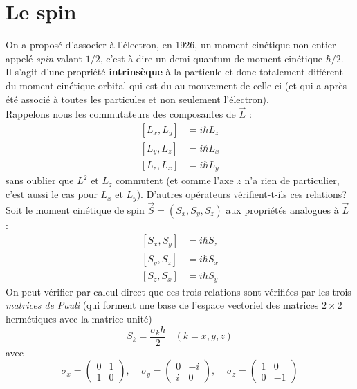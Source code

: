 \documentclass	[11pt, a4paper, openany]{book}
\begin{document}
	\section{Le spin}
	On a proposé d'associer à l'électron, en 1926, un moment cinétique non entier appelé
	\textit{spin} valant $1/2$, c'est-à-dire un demi quantum de moment cinétique $\hbar/
	2$.\\
	Il s'agit d'une propriété \textbf{intrinsèque} à la particule et donc totalement 
	différent du moment cinétique orbital qui est du au mouvement de celle-ci (et qui 
	a après été associé à toutes les particules et non seulement l'électron).\\
	Rappelons nous les commutateurs des composantes de $\vec{L}$ :
	\begin{equation}
		\begin{array}{ll}
			[L_x,L_y]            & = i\hbar L_z \\
			\left[L_y,L_z\right] & = i\hbar L_x \\
			\left[L_z,L_x\right] & = i\hbar L_y 
		\end{array}
	\end{equation}
	sans oublier que $L^2$ et $L_z$ commutent (et comme l'axe $z$ n'a rien de particulier,
	c'est aussi le cas pour $L_x$ et $L_y$). D'autres opérateurs vérifient-t-ils ces 
	relations? \\
	Soit le moment cinétique de spin $\vec{S} = (S_x,S_y,S_z)$ aux propriétés analogues
	à $\vec{L}$ :
	\begin{equation}
		\begin{array}{cc}
			[S_x,S_y]            & = i\hbar S_z \\
			\left[S_y,S_z\right] & = i\hbar S_x \\
			\left[S_z,S_x\right] & = i\hbar S_y 
		\end{array}
	\end{equation}
	On peut vérifier par calcul direct que ces trois relations sont vérifiées par les 
	trois \textit{matrices de Pauli} (qui forment une base de l'espace vectoriel des 
	matrices $2\times2$ hermétiques avec la matrice unité)
	\begin{equation}
		S_k = \frac{\sigma_k \hbar}{2}\ \ \ \ (k=x,y,z)
	\end{equation}
	avec
	\begin{equation}
		\sigma_x = \left(\begin{array}{cc}
		0 & 1\\
		1 & 0
		\end{array}\right),\ \ \ \ \ \sigma_y =	\left(\begin{array}{cc}
		0 & -i\\
		i & 0
		\end{array}\right),\ \ \ \ \ \sigma_z =	\left(\begin{array}{cc}
		1 & 0\\
		0 & -1
		\end{array}\right)
	\end{equation}
\end{document}
